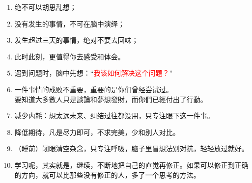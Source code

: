 \documentclass[12pt,a4paper]{article}
\newcommand{\textred}[1]{\textcolor{red}{#1}}  %
\begin{document}
\begin{enumerate}
    
    \item   绝不可以胡思乱想；

    \item   没有发生的事情，不可在脑中演绎；

    \item   发生超过三天的事情，绝对不要去回味；

    \item   此时此刻，更值得你去感受和体会。

    \item   遇到问题时，脑中先想：“\textred{我该如何解决这个问题？}”
    
    \item   一件事情的成败不重要，重要的是你们曾经尝试过。\\[-3pt]
    {\small 要知道大多數人只是談論和夢想發財，而你們已經付出了行動。}

    \item   减少内耗：想太远未来、纠结过往都没用，只专注眼下这一件事。
    \item   降低期待，凡是尽力即可，不求完美，少和别人对比。
    \item   （睡前）闭眼清空杂念，只专注呼吸，脑子里冒想法别对抗，轻轻放过就好。
    \item   学习呢，其实就是，继续，不断地把自己的直觉再修正。如果可以修正到正确的方向，就可以比那些没有修正的人，多了一个思考的方法。






\end{enumerate}
\end{document}
